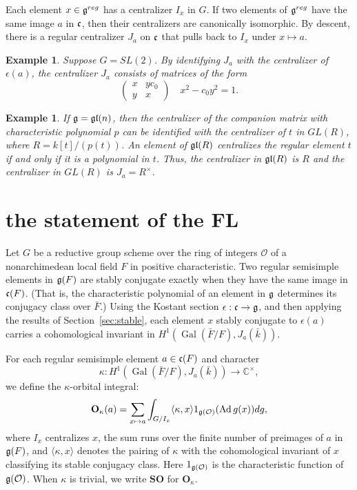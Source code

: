 \documentclass[brochure,english,12pt]{bourbaki}
\newtheorem{example}[equation]{Example}
\def\op#1{{\operatorname{#1}}}
\newcommand{\ring}[1]{\mathbb{#1}}
\def\SO{{\mathbf {SO}}}
\def\OO{{\mathbf O}}
\def\gl{\frak{gl}}
\def\g{\frak{g}}
\def\cc{\frak{c}}
\def\O{{\mathcal O}}
\begin{document}
Each element $x\in\g^{reg}$ has a centralizer $I_x$ in $G$.  If two
elements of $\g^{reg}$ have the same image $a$ in $\cc$, then their
centralizers are canonically isomorphic.  By descent, there is a
regular centralizer $J_a$ on $\cc$ that pulls back to $I_x$ under
$x\mapsto a$.



\begin{example}  Suppose $G=SL(2)$.  By identifying $J_a$ with the centralizer of
  $\epsilon(a)$, the centralizer $J_a$ consists of
  matrices of the form
\[
\begin{pmatrix} x & y c_0\\ y & x
\end{pmatrix}
\quad x^2 - c_0 y^2 = 1.
\]
\end{example}

\begin{example}
  If $\g=\gl(n)$, then the centralizer of the companion matrix with
  characteristic polynomial $p$ can be identified with the centralizer
  of $t$ in $GL(R)$, where $R=k[t]/(p(t))$.  An
  element of $\gl(R)$ centralizes the regular element $t$ if and only if it is a polynomial
  in $t$.  Thus, the centralizer in $\gl(R)$ is $R$ and the centralizer in $GL(R)$
 is $J_a = R^\times$.
\end{example}


\section{the statement of the FL}

Let $G$ be a reductive group scheme over the ring of integers $\O$ of a nonarchimedean local field $F$
in positive characteristic.
Two regular semisimple elements in $\g(F)$ are stably conjugate exactly when they have the
same image in $\cc(F)$.  (That is, the characteristic polynomial of an element in $\g$ determines
its conjugacy class over $\bar F$.)  Using the Kostant section $\epsilon:\cc\to\g$,
and then applying the results of  Section~\ref{sec:stable}, each element $x$ stably conjugate
to $\epsilon(a)$  carries
a cohomological invariant in $H^1(\op{Gal}(\bar F/F),J_a(\bar k))$.

For each regular semisimple element $a\in \cc(F)$ and character 
\[
\kappa:H^1(\op{Gal}(\bar F/F),J_a(\bar k))\to\ring{C}^\times,
\]
we define the
$\kappa$-orbital integral:
\[
\OO_\kappa(a) = \sum_ {x\mapsto a} \int_{G/I_x} \langle\kappa,x\rangle 1_{\g(\O)} (\op{Ad}\, g(x)) dg,
\]
where $I_x$ centralizes $x$, the sum runs over the finite number of preimages of $a$ in $\g(F)$,
and  $\langle\kappa,x\rangle$
denotes the pairing of $\kappa$ with the cohomological invariant of $x$ classifying its stable conjugacy class. 
Here $1_{\g(\O)}$ is the characteristic function of $\g(\O)$.
When $\kappa$ is trivial, we write $\SO$ for $\OO_\kappa$.  
\end{document}
